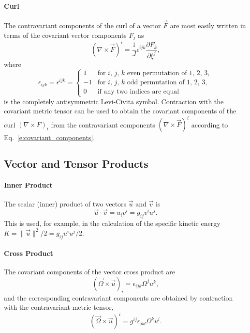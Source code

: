 \documentclass{report}
\begin{document}
\paragraph{Curl} The contravariant components of the curl of a vector $\vec{F}$ are most easily written in terms of the covariant vector components $F_j$ as
\begin{equation}
(\nabla \times \vec{F})^i = \frac{1}{J} \epsilon^{ijk} \frac{\partial F_k}{\partial \xi^j},
\end{equation}
where  
\[
\epsilon_{ijk} = \epsilon^{ijk} = 
\begin{cases}
1 & \text{for $i$, $j$, $k$ even permutation of 1, 2, 3},\\
-1 & \text{for $i$, $j$, $k$ odd permutation of 1, 2, 3},\\
0 & \text{if any two indices are equal}
\end{cases}
\]
is the completely antisymmetric Levi-Civita symbol. Contraction with the covariant metric tensor can be used to obtain the covariant components of the curl $(\nabla \times F)_i$ from the contravariant components $(\nabla \times \vec{F})^i$ according to  Eq.~\eqref{e:covariant_components}.

\subsection{Vector and Tensor Products}

\paragraph{Inner Product} The scalar (inner) product of two vectors $\vec{u}$ and $\vec{v}$ is 
\begin{equation}
\vec{u} \cdot \vec{v} = u_i v^i = g_{ij} v^i u^j.
\end{equation}
This is used, for example, in the calculation of the specific kinetic energy $K = \| \vec{u} \|^2/2 = g_{ij} u^i u^j/2$.

\paragraph{Cross Product}
The covariant components of the vector cross product are
\begin{equation}
(\vec{\Omega} \times \vec{u})_i = \epsilon_{ijk} \Omega^j u^k,
\end{equation}
and the corresponding contravariant components are obtained by contraction with the contravariant metric tensor,
\begin{equation}
(\vec{\Omega} \times \vec{u})^i = g^{ij} \epsilon_{jkl} \Omega^k u^l.
\end{equation}
\end{document}
